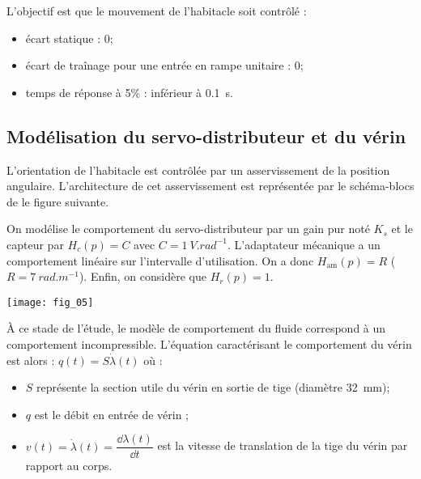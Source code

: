 \begin{obj}
L'objectif est que le mouvement de l'habitacle soit contrôlé :
\begin{itemize}
\item écart statique : 0\degres;
\item écart de traînage pour une entrée en rampe unitaire : 0\degres;
\item temps de réponse à 5\% : inférieur à \SI{0,1}{s}.

\end{itemize}
\end{obj}

\subsection*{Modélisation du servo-distributeur et du vérin}

L'orientation de l'habitacle est contrôlée par un asservissement de la position angulaire. L'architecture de cet asservissement est représentée par le schéma-blocs de le figure suivante.

On modélise le comportement du servo-distributeur par un gain pur noté $K_s$ et le capteur par $H_c(p)=C$ avec $C=\SI{1}{V.rad^{-1}}$.  L'adaptateur mécanique a un comportement linéaire sur l'intervalle d'utilisation. On a donc $H_{\text{am}}(p)=R$ ($R=\SI{7}{rad.m^{-1}}$). Enfin, on considère que $H_r(p)=1$. 

\begin{center}
\texttt{[image: fig\_05]}
\end{center}

À ce stade de l'étude, le modèle de comportement du fluide correspond à un comportement incompressible. L'équation caractérisant le comportement du vérin est alors : $q(t)=S\dot{\lambda}(t)$ où :
\begin{itemize}
\item $S$ représente la section utile du vérin en sortie de tige (diamètre \SI{32}{mm});
\item $q$ est le débit en entrée de vérin ;
\item $v(t)=\dot{\lambda}(t)=\dfrac{\dd \lambda(t) }{\dd t}$ est la vitesse de translation de la tige du vérin par rapport au corps.
\end{itemize}
% 

